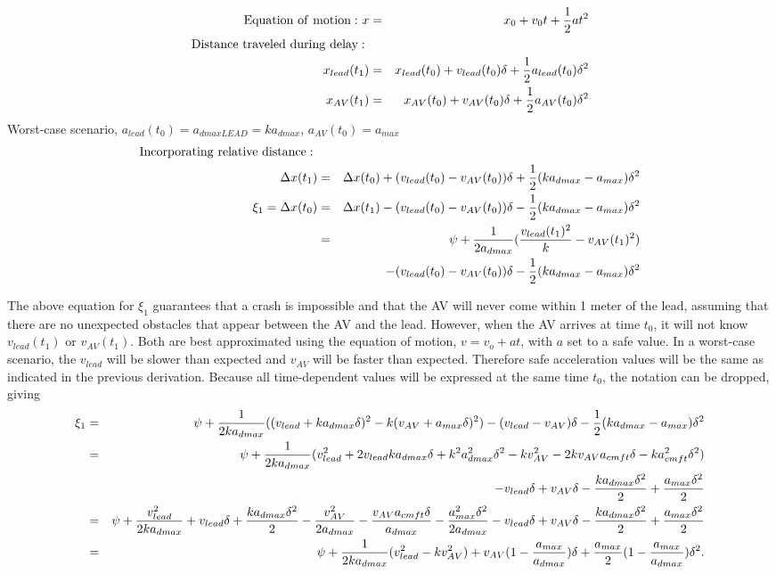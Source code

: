 \documentclass[conference]{IEEEtran}
\begin{document}
\begin{appendix}
\begin{eqnarray*}
{\rm Equation\ of\ motion:\ } x &=& x_0 + v_0t + {1\over 2}at^2 \\
{\rm Distance\ traveled\ during\ delay : \ } \\
x_{lead}(t_1) &=& x_{lead}(t_0)+v_{lead}(t_0)\delta+{1\over 2}a_{lead}(t_0)\delta^2 \\
x_{AV}(t_1) &=& x_{AV}(t_0)+v_{AV}(t_0)\delta+{1\over 2}a_{AV}(t_0)\delta^2
\end{eqnarray*}
Worst-case scenario, $a_{lead}(t_0)=a_{dmaxLEAD}=ka_{dmax}$, $a_{AV}(t_0)=a_{max}$
\begin{eqnarray*}
{\rm Incorporating\ relative\ distance:\ } \\
\Delta x(t_1) &=& \Delta x(t_0) + (v_{lead}(t_0)-v_{AV}(t_0))\delta + {1\over 2}(ka_{dmax}-a_{max})\delta^2\\
\xi_1 = \Delta x(t_0) &=& \Delta x(t_1) - (v_{lead}(t_0)-v_{AV}(t_0))\delta - {1\over 2}(ka_{dmax}-a_{max})\delta^2\\
&=& \psi+{1\over 2a_{dmax}}({v_{lead}(t_1)^2\over k}-v_{AV}(t_1)^2) \\
&& - (v_{lead}(t_0)-v_{AV}(t_0))\delta - {1\over 2}(ka_{dmax}-a_{max})\delta^2
\end{eqnarray*}

The above equation for $\xi_1$ guarantees that a crash is impossible and that the AV will never come within 1 meter of the lead, assuming that there are no unexpected obstacles that appear between the AV and the lead. However, when the AV arrives at time $t_0$, it will not know $v_{lead}(t_1)$ or $v_{AV}(t_1)$. Both are best approximated using the equation of motion, $v=v_o+at$, with $a$ set to a safe value. In a worst-case scenario, the $v_{lead}$ will be slower than expected and $v_{AV}$ will be faster than expected. Therefore safe acceleration values will be the same as indicated in the previous derivation. Because all time-dependent values will be expressed at the same time $t_0$, the notation can be dropped, giving
\begin{eqnarray*}
\xi_1 &=& \psi+{1\over 2ka_{dmax}}((v_{lead}+ka_{dmax}\delta)^2-k(v_{AV}+a_{max}\delta)^2) - (v_{lead}-v_{AV})\delta - {1\over 2}(ka_{dmax}-a_{max})\delta^2 \\
&=& \psi+{1\over 2ka_{dmax}}(v_{lead}^2+2v_{lead}ka_{dmax}\delta+k^2a_{dmax}^2\delta^2-kv_{AV}^2-2kv_{AV}a_{cmft}\delta-ka_{cmft}^2\delta^2) \\
&& -v_{lead}\delta+v_{AV}\delta-{ka_{dmax}\delta^2\over 2}+{a_{max}\delta^2\over2} \\
&=& \psi+{v_{lead}^2\over 2ka_{dmax}}+{v_{lead}\delta}+{ka_{dmax}\delta^2 \over 2}-{v_{AV}^2\over 2a_{dmax}}-{v_{AV}a_{cmft}\delta \over a_{dmax}}-{a_{max}^2\delta^2\over 2a_{dmax}}-v_{lead}\delta+v_{AV}\delta-{ka_{dmax}\delta^2\over 2}+{a_{max}\delta^2\over2} \\
&=& \psi+{1\over 2ka_{dmax}}(v_{lead}^2-kv_{AV}^2)+v_{AV}(1-{a_{max}\over a_{dmax}})\delta+{a_{max}\over 2}(1-{a_{max}\over a_{dmax}})\delta^2.
\end{eqnarray*}


\end{appendix}
\end{document}
